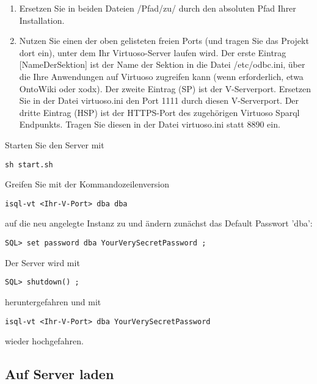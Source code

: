 \documentclass[11pt,a4paper]{article}
\begin{document}
\begin{enumerate}
	\item Ersetzen Sie in beiden Dateien /Pfad/zu/ durch den absoluten Pfad Ihrer Installation.
	\item Nutzen Sie einen der oben gelisteten freien Ports (und tragen Sie das Projekt dort ein), unter dem Ihr Virtuoso-Server laufen wird. Der erste Eintrag [NameDerSektion] ist der Name der Sektion in die Datei /etc/odbc.ini, über die Ihre Anwendungen auf Virtuoso zugreifen kann (wenn erforderlich, etwa OntoWiki oder xodx). Der zweite Eintrag (SP) ist der V-Serverport. Ersetzen Sie in der Datei virtuoso.ini den Port 1111 durch diesen V-Serverport. Der dritte Eintrag (HSP) ist der HTTPS-Port des zugehörigen Virtuoso Sparql Endpunkts. Tragen Sie diesen in der Datei virtuoso.ini statt 8890 ein.
\end{enumerate}
Starten Sie den Server mit
\begin{lstlisting}
sh start.sh
\end{lstlisting}
Greifen Sie mit der Kommandozeilenversion
\begin{lstlisting}
isql-vt <Ihr-V-Port> dba dba
\end{lstlisting}
auf die neu angelegte Instanz zu und ändern zunächst das Default Passwort 'dba':
\begin{lstlisting}
SQL> set password dba YourVerySecretPassword ;
\end{lstlisting}
Der Server wird mit
\begin{lstlisting}
SQL> shutdown() ;
\end{lstlisting}
heruntergefahren und mit
\begin{lstlisting}
isql-vt <Ihr-V-Port> dba YourVerySecretPassword
\end{lstlisting}
wieder hochgefahren.
\subsection{Auf Server laden}
\end{document}
